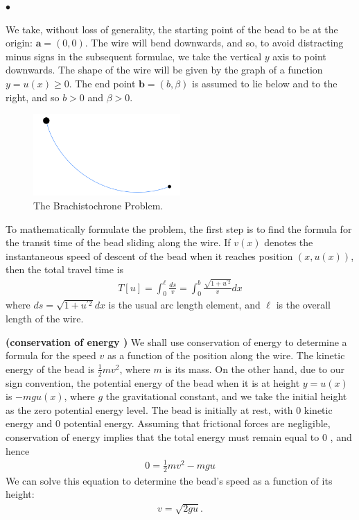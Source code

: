 \documentclass{article}
\newcommand{\bfs}[1]{\textbf{({#1}) }}
\begin{document}
$\bullet$ 

We take, without loss of generality, the starting point of the bead to be at the origin: $\mathbf{a}=(0,0)$. The wire will bend downwards, and so, to avoid distracting minus signs in the subsequent formulae, we take the vertical $y$ axis to point downwards. The shape of the wire will be given by the graph of a function $y=u(x) \geq 0$. The end point $\mathbf{b}=(b, \beta)$ is assumed to lie below and to the right, and so $b>0$ and $\beta>0$.
\begin{figure}[ht]
    \centering
    \includegraphics[width=0.5\textwidth]{Figs/a5.png}
    \caption{The Brachistochrone Problem.}
\end{figure}
To mathematically formulate the problem, the first step is to find the formula for the transit time of the bead sliding along the wire. If $v(x)$ denotes the instantaneous speed of descent of the bead when it reaches position $(x, u(x))$, then the total travel time is
\begin{align}
T[u]=\int_{0}^{\ell} \frac{d s}{v}=\int_{0}^{b} \frac{\sqrt{1+u^{\prime 2}}}{v} d x\label{eq:udjbcadf}
\end{align}
where $d s=\sqrt{1+u^{\prime 2}} d x$ is the usual arc length element, and $\ell$ is the overall length of the wire.
\begin{rema}\bfs{conservation of energy }
We shall use conservation of energy to determine a formula for the speed $v$ as a function of the position along the wire. The kinetic energy of the bead is $\frac{1}{2} m v^{2}$, where $m$ is its mass. On the other hand, due to our sign convention, the potential energy of the bead when it is at height $y=u(x)$ is $-m g u(x)$, where $g$ the gravitational constant, and we take the initial height as the zero potential energy level. The bead is initially at rest, with 0 kinetic energy and 0 potential energy. Assuming that frictional forces are negligible, conservation of energy implies that the total energy must remain equal to $0$ , and hence
\begin{align*}
0=\frac{1}{2} m v^{2}-m g u
\end{align*}
We can solve this equation to determine the bead's speed as a function of its height: \begin{align*} v=\sqrt{2 g u}. \end{align*}
\end{rema}
\end{document}
